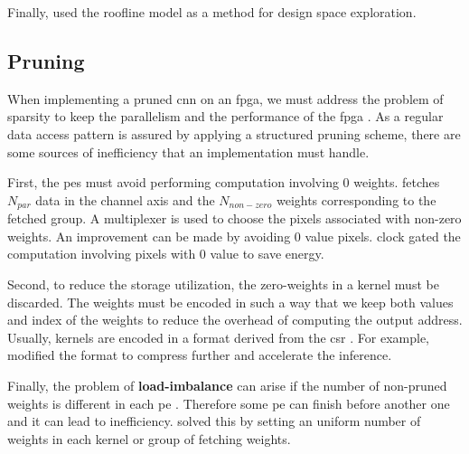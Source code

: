 Finally, \textcite{liu_fpga-based_2019} used the roofline model as a method for design space exploration.
%
%
\subsection{Pruning} \label{subsec:impl_prun}
%
%
When implementing a pruned \acrshort{cnn} on an \acrshort{fpga}, we must address the problem of sparsity to keep the parallelism and the performance of the \acrshort{fpga} \cite{zhu_efficient_2020}. As a regular data access pattern is assured by applying a structured pruning scheme, there are some sources of inefficiency that an implementation must handle.

First, the \acrshort{pe}s must avoid performing computation involving 0 weights. \textcite{kang_accelerator-aware_2020} fetches $N_{par}$ data in the channel axis and the $N_{non-zero}$ weights corresponding to the fetched group. A multiplexer is used to choose the pixels associated with non-zero weights. An improvement can be made by avoiding 0 value pixels. \textcite{zhu_efficient_2020} clock gated the computation involving pixels with 0 value to save energy.

Second, to reduce the storage utilization, the zero-weights in a kernel must be discarded. The weights must be encoded in such a way that we keep both values and index of the weights to reduce the overhead of computing the output address. Usually, kernels are encoded in a format derived from the \acrfull{csr} \cite{mao_exploring_2017}. For example, \cite{zhu_efficient_2020} modified the format to compress further and accelerate the inference.

Finally, the problem of \textbf{load-imbalance} can arise if the number of non-pruned weights is different in each \acrshort{pe} \cite{kim_zena_2018}. Therefore some \acrshort{pe} can finish before another one and it can lead to inefficiency. \textcite{zhu_efficient_2020, kang_accelerator-aware_2020} solved this by setting an uniform number of weights in each kernel or group of fetching weights.
